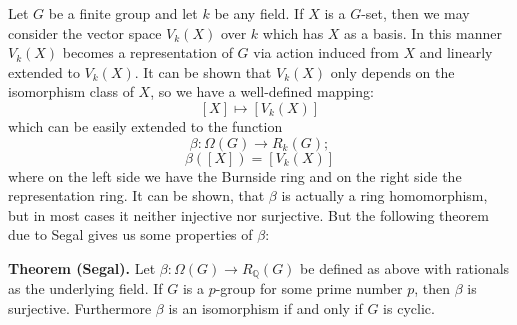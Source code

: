 \documentclass[12pt]{article}
\begin{document}
Let $G$ be a finite group and let $k$ be any field. If $X$ is a $G$-set, then we may consider the vector space $V_k(X)$ over $k$ which has $X$ as a basis. In this manner $V_k(X)$ becomes a representation of $G$ via action induced from $X$ and linearly extended to $V_k(X)$. It can be shown that $V_k(X)$ only depends on the isomorphism class of $X$, so we have a well-defined mapping:
$$[X]\mapsto [V_k(X)]$$
which can be easily extended to the function
$$\beta:\Omega(G)\to R_k(G);$$
$$\beta([X])=[V_k(X)]$$
where on the left side we have the Burnside ring and on the right side the representation ring. It can be shown, that $\beta$ is actually a ring homomorphism, but in most cases it neither injective nor surjective. But the following theorem due to Segal gives us some properties of $\beta$:

\textbf{Theorem (Segal).} Let $\beta:\Omega(G)\to R_{\mathbb{Q}}(G)$ be defined as above with rationals as the underlying field. If $G$ is a $p$-group for some prime number $p$, then $\beta$ is surjective. Furthermore $\beta$ is an isomorphism if and only if $G$ is cyclic.
\end{document}

